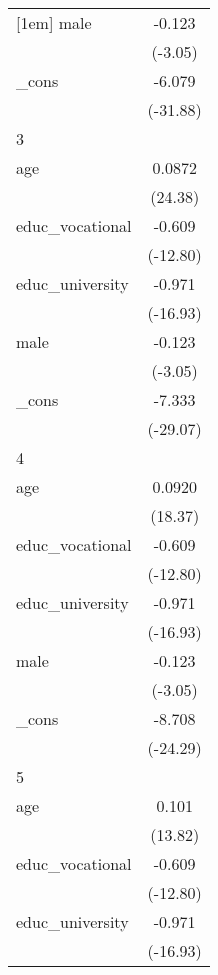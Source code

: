 {\begin{tabular}{l*{1}{c}}
[1em]
male        &      -0.123\sym{**} \\
            &     (-3.05)         \\
[1em]
\_cons      &      -6.079\sym{***}\\
            &    (-31.88)         \\
\hline
3           &                     \\
age         &      0.0872\sym{***}\\
            &     (24.38)         \\
[1em]
educ\_vocational&      -0.609\sym{***}\\
            &    (-12.80)         \\
[1em]
educ\_university&      -0.971\sym{***}\\
            &    (-16.93)         \\
[1em]
male        &      -0.123\sym{**} \\
            &     (-3.05)         \\
[1em]
\_cons      &      -7.333\sym{***}\\
            &    (-29.07)         \\
\hline
4           &                     \\
age         &      0.0920\sym{***}\\
            &     (18.37)         \\
[1em]
educ\_vocational&      -0.609\sym{***}\\
            &    (-12.80)         \\
[1em]
educ\_university&      -0.971\sym{***}\\
            &    (-16.93)         \\
[1em]
male        &      -0.123\sym{**} \\
            &     (-3.05)         \\
[1em]
\_cons      &      -8.708\sym{***}\\
            &    (-24.29)         \\
\hline
5           &                     \\
age         &       0.101\sym{***}\\
            &     (13.82)         \\
[1em]
educ\_vocational&      -0.609\sym{***}\\
            &    (-12.80)         \\
[1em]
educ\_university&      -0.971\sym{***}\\
            &    (-16.93)         \\

\end{tabular}}
